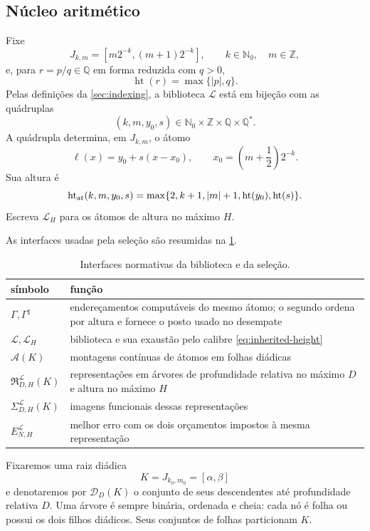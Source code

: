 \documentclass[11pt,a4paper]{article}
\theoremstyle{definition}
\theoremstyle{remark}
\newcommand{\Nzero}{\mathbb{N}_0}
\newcommand{\Qstar}{\mathbb{Q}^{\!*}}
\newcommand{\Aclass}{\mathcal{A}}
\newcommand{\Library}{\mathcal{L}}
\newcommand{\Representations}{\mathfrak{R}}
\newcommand{\height}{\operatorname{ht}}
\begin{document}
\subsection{Núcleo aritmético}

Fixe
\[
 J_{k,m}=[m2^{-k},(m+1)2^{-k}],
 \qquad k\in\Nzero,\quad m\in\mathbb Z,
\]
e, para $r=p/q\in\mathbb Q$ em forma reduzida com $q>0$,
\[
 \height(r)=\max\{|p|,q\}.
\]
Pelas definições da \cref{sec:indexing}, a biblioteca $\Library$ está em bijeção com as
quádruplas
\[
 (k,m,y_0,s)\in\Nzero\times\mathbb Z\times\mathbb Q\times\Qstar.
\]
A quádrupla determina, em $J_{k,m}$, o átomo
\begin{equation}
 \ell(x)=y_0+s(x-x_0),
 \qquad x_0=\left(m+\frac12\right)2^{-k}.
 \label{eq:inherited-atom}
\end{equation}
Sua altura é
\begin{equation}
 \height_{\rm at}(k,m,y_0,s)
 =\max\{2,k+1,|m|+1,\height(y_0),\height(s)\}.
 \label{eq:inherited-height}
\end{equation}
Escreva $\Library_H$ para os átomos de altura no máximo $H$.

As interfaces usadas pela seleção são resumidas na
\cref{tab:interfaces}.
\begin{table}[t]
 \centering
 \caption{Interfaces normativas da biblioteca e da seleção.}
 \label{tab:interfaces}
 \small
 \begin{tabularx}{\linewidth}{@{}lX@{}}
  \toprule
  símbolo & função\\
  \midrule
  $\Gamma,\Gamma^\sharp$ & endereçamentos computáveis do mesmo átomo; o
  segundo ordena por altura e fornece o posto usado no desempate\\
  $\Library,\Library_H$ & biblioteca e sua exaustão pelo calibre
  \eqref{eq:inherited-height}\\
  $\Aclass(K)$ & montagens contínuas de átomos em folhas diádicas\\
  $\Representations_{D,H}^{\Library}(K)$ & representações em árvores de
  profundidade relativa no máximo $D$ e altura no máximo $H$\\
  $\Sigma_{D,H}^{\Library}(K)$ & imagens funcionais dessas representações\\
  $E_{N,H}^{\Library}$ & melhor erro com os dois orçamentos impostos à mesma
  representação\\
  \bottomrule
 \end{tabularx}
\end{table}

Fixaremos uma raiz diádica
\[
 K=J_{k_0,m_0}=[\alpha,\beta]
\]
e denotaremos por $\mathcal D_D(K)$ o conjunto de seus descendentes até
profundidade relativa $D$. Uma árvore é sempre binária, ordenada e cheia:
cada nó é folha ou possui os dois filhos diádicos. Seus conjuntos de folhas
particionam $K$.
\end{document}
